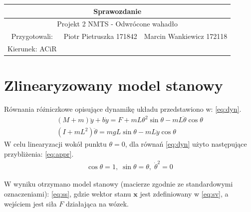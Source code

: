 \documentclass{article}
\begin{document}
\begin{tabular}{|c|c|c|}
\hline 
\multicolumn{3}{|c|}{\huge Sprawozdanie } \\ 
\hline 
\multicolumn{3}{|c|}{\LARGE Projekt 2 NMTS - Odwrócone wahadło} \\ 
\hline 
\Large Przygotowali: &\Large Piotr Pietruszka 171842 &\Large Marcin Wankiewicz 172118  \\ 
\hline 
\Large Kierunek: ACiR  \\ 
\hline 
 
\end{tabular} 

\section{Zlinearyzowany model stanowy}

Równania różniczkowe opisujące dynamikę układu przedstawiono w: \ref{eq:dyn}.
\begin{equation}\label{eq:dyn}
 \begin{array}{l}
  (M+m) \ddot{y} + b\dot{y} = F + mL\theta^2 \sin\theta - mL\ddot{\theta}\cos\theta \\
  (I + mL^2)\ddot{\theta} = mgL\sin\theta - mL\ddot{y}\cos\theta
 \end{array}
\end{equation}
W celu linearyzacji wokół punktu $\theta=0$, dla równań \ref{eq:dyn} użyto następujące przybliżenia: \ref{eq:appr}.
\begin{equation}\label{eq:appr}
 \begin{array}{l}
  \cos\theta = 1,\;  \sin\theta=\theta, \; \dot{\theta}^2 = 0
 \end{array}
\end{equation}

W wyniku otrzymano model stanowy (macierze zgodnie ze standardowymi oznaczeniami): \ref{eq:ss}, gdzie wektor stanu $\textbf{x}$ jest zdefiniowany w \ref{eq:sv}, a wejściem jest siła $F$ działająca na wózek.
\end{document}
